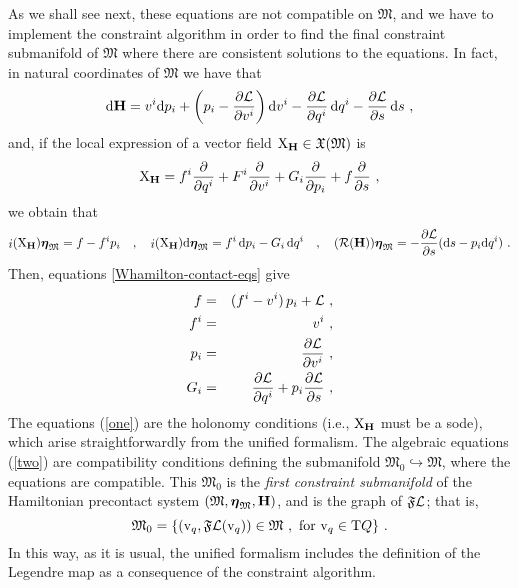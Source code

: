 \documentclass[12pt]{report}
\def\bea{\begin{eqnarray}}
\def\eea{\end{eqnarray}}
\def\derpar#1#2{\frac{\partial{#1}}{\partial{#2}}}
\def\vf{\mathfrak X}
\def\Lag{{\cal L}}
\def\d{{\rm d}}
\def\bmeta{\mbox{\boldmath $\eta$}}
\def\X{{\rm X}}
\def\Tan{{\rm T}}
\def\inn{\mathop{i}\nolimits}
\newcommand{\Reeb}{\mathcal{R}}
\begin{document}
As we shall see next,
these equations are not compatible on $\mathfrak{M}$,
and we have to implement the constraint algorithm
in order to find the final constraint submanifold of $\mathfrak{M}$
where there are consistent solutions
to the equations. 
In fact, in natural coordinates of $\mathfrak{M}$ we have that
$$
\d{\bf H}=v^i\d p_i+\left(p_i -\derpar{\Lag}{v^i}\right)\d v^i-\derpar{\Lag}{q^i}\,\d q^i-\derpar{\Lag}{s}\,\d s \ ,
$$
and, if the local expression of
a vector field $\X_{\bf H}\in\vf(\mathfrak{M})$ is
$$
\X_{\bf H} = f^i\derpar{}{q^i}+F^i\derpar{}{v^i}+G_i\derpar{}{p_i}+f\derpar{}{s} \ ,
$$
we obtain that
$$
\inn(\X_{\bf H})\bmeta_{\mathfrak{M}}=f-f^ip_i \quad , \quad
\inn(\X_{\bf H})\d\bmeta_{\mathfrak{M}}=f^i\,\d p_i-G_i\,\d q^i 
\quad , \quad
({\Reeb}({\bf H}))\bmeta_{\mathfrak{M}}=-\derpar{\Lag}{s}(\d s-p_i\d q^i) \ .
$$
Then, equations \eqref{Whamilton-contact-eqs} give
\bea
f&=&(f^i-v^i)\,p_i+\Lag \ ,
\label{zero} \\
f^i&=&v^i \ , \label{one} \\
p_i&=&\derpar{\Lag}{v^i} \ ,
\label{two} \\
G_i&=&\derpar{\Lag}{q^i}
+p_i\derpar{\Lag}{s} \ ,
\label{three}
\eea
The equations (\ref{one}) are the holonomy conditions
(i.e., $\X_{\bf H}$ must be a {\sc sode}),
which arise straightforwardly from the unified formalism.
The algebraic equations (\ref{two}) are compatibility conditions
defining the submanifold $\mathfrak{M}_0\hookrightarrow\mathfrak{M}$,
where the equations are compatible.
This $\mathfrak{M}_0$ is the {\sl first constraint submanifold} of the Hamiltonian precontact system $(\mathfrak{M},\bmeta_{\mathfrak{M}},{\bf H})$, and is the graph of $\mathfrak{F}\Lag$; that is,
$$
\mathfrak{M}_0=\{ ({\rm v}_q,\mathfrak{F}\Lag({\rm v}_q))\in\mathfrak{M} \ ,\ \mbox{\rm for ${\rm v}_q\in\Tan Q$}\} \ .
$$
In this way, as it is usual, the unified formalism includes the definition of
the Legendre map as a consequence of the constraint algorithm.
\end{document}
